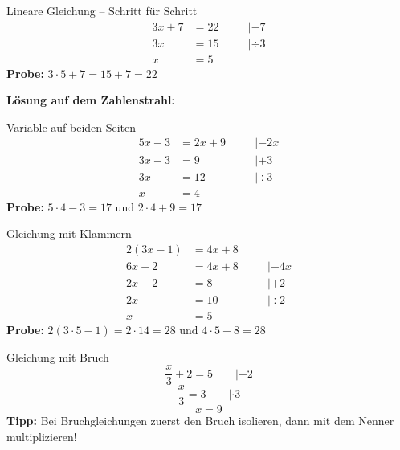 \documentclass[12pt, a4paper]{article}
\begin{document}
\begin{examplebox}{Lineare Gleichung -- Schritt f\"ur Schritt}
\begin{align*}
  3x + 7 &= 22  &\quad &| -7  \\
  3x     &= 15  &\quad &| \div 3 \\
  x      &= 5
\end{align*}
\textbf{Probe:} $3 \cdot 5 + 7 = 15 + 7 = 22$ \checkmark

\vspace{0.3cm}
\textbf{L\"osung auf dem Zahlenstrahl:}

\end{examplebox}

\begin{examplebox}{Variable auf beiden Seiten}
\begin{align*}
  5x - 3 &= 2x + 9  &\quad &| -2x \\
  3x - 3 &= 9        &\quad &| +3  \\
  3x     &= 12       &\quad &| \div 3 \\
  x      &= 4
\end{align*}
\textbf{Probe:} $5\cdot4 - 3 = 17$ und $2\cdot4 + 9 = 17$ \checkmark
\end{examplebox}

\begin{examplebox}{Gleichung mit Klammern}
\begin{align*}
  2(3x - 1) &= 4x + 8  \\
  6x - 2    &= 4x + 8  & \quad &| -4x \\
  2x - 2    &= 8        & \quad &| +2  \\
  2x        &= 10       & \quad &| \div 2 \\
  x         &= 5
\end{align*}
\textbf{Probe:} $2(3\cdot5-1) = 2\cdot14 = 28$ und $4\cdot5+8 = 28$ \checkmark
\end{examplebox}

\begin{examplebox}{Gleichung mit Bruch}
\[
  \frac{x}{3} + 2 = 5 \qquad | -2
\]
\[
  \frac{x}{3} = 3 \qquad | \cdot 3
\]
\[
  x = 9
\]
\textbf{Tipp:} Bei Bruchgleichungen zuerst den Bruch isolieren, dann mit dem Nenner multiplizieren!
\end{examplebox}
\end{document}
